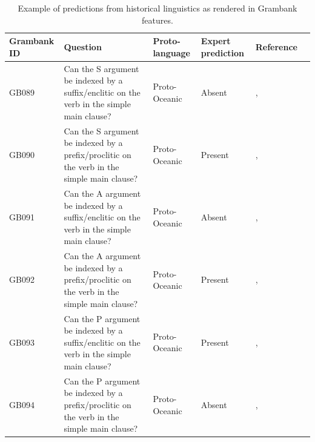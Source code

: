\documentclass[12pt,letterpaper]{article}
\begin{document}
\begin{table}
\caption{Example of predictions from historical linguistics as rendered in Grambank features.}
\label{example_HL_prediction_table}

\begin{tabular}{|p{3cm}| p{4.5cm}|  p{2.5cm}| p{2.5cm} | p{3cm} |p{2cm}| }
\hline
\textbf{Grambank ID} & \textbf{Question} & \textbf{Proto-language} & \textbf{Expert prediction} & \textbf{Reference} \\ 
\hline
GB089  &Can the S argument be indexed by a suffix/enclitic on the verb in the simple main clause? &Proto-Oceanic &Absent & \citet[498-499]{ross2004morphosyntactic}, \citet[83]{lynchrosscrowley_proto_grammar_oceanic} \\ \hline
GB090 &Can the S argument be indexed by a prefix/proclitic on the verb in the simple main clause? &Proto-Oceanic &Present &\citet[498-499]{ross2004morphosyntactic}, \citet[83]{lynchrosscrowley_proto_grammar_oceanic}  \\ \hline
GB091 &Can the A argument be indexed by a suffix/enclitic on the verb in the simple main clause? &Proto-Oceanic &Absent &\citet[498-499]{ross2004morphosyntactic}, \citet[83]{lynchrosscrowley_proto_grammar_oceanic} \\ \hline
GB092  &Can the A argument be indexed by a prefix/proclitic on the verb in the simple main clause? &Proto-Oceanic &Present &\citet[498-499]{ross2004morphosyntactic}, \citet[83]{lynchrosscrowley_proto_grammar_oceanic}  \\ \hline
GB093  &Can the P argument be indexed by a suffix/enclitic on the verb in the simple main clause? &Proto-Oceanic &Present &\citet[498-499]{ross2004morphosyntactic}, \citet[83]{lynchrosscrowley_proto_grammar_oceanic} \\ \hline
GB094  &Can the P argument be indexed by a prefix/proclitic on the verb in the simple main clause? &Proto-Oceanic &Absent & \citet[498-499]{ross2004morphosyntactic}, \citet[83]{lynchrosscrowley_proto_grammar_oceanic} \\ \hline
\end{tabular}
\end{table}



\FloatBarrier
%

\end{document}
